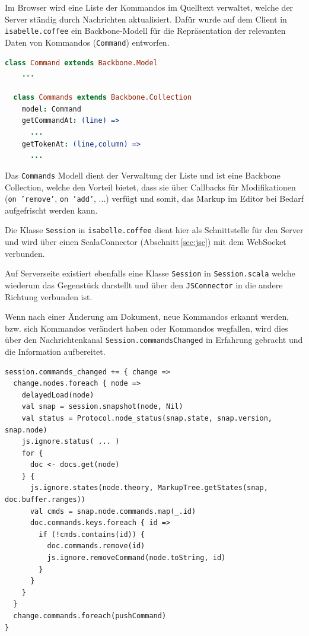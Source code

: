 Im Browser wird eine Liste der Kommandos im Quelltext verwaltet, welche der Server ständig durch
Nachrichten aktualisiert. Dafür wurde auf dem Client in \texttt{isabelle.coffee} ein Backbone-Modell
für die Repräsentation der relevanten Daten von Kommandos (\texttt{Command}) entworfen.

\begin{lstlisting}[language=coffee]
  class Command extends Backbone.Model
    ...

  class Commands extends Backbone.Collection
    model: Command    
    getCommandAt: (line) => 
      ...
    getTokenAt: (line,column) =>
      ...
\end{lstlisting}

Das \texttt{Commands} Modell dient der Verwaltung der Liste und ist eine Backbone Collection, welche
den Vorteil bietet, dass sie über Callbacks für Modifikationen (\texttt{on 'remove'}, \texttt{on
'add'}, ...) verfügt und somit, das Markup im Editor bei Bedarf aufgefrischt werden kann.

Die Klasse \texttt{Session} in \texttt{isabelle.coffee} dient hier als Schnittstelle für den Server
und wird über einen ScalaConnector (Abschnitt\,\ref{sec:jsc}) mit dem WebSocket verbunden.

Auf Serverseite existiert ebenfalls eine Klasse \texttt{Session} in \texttt{Session.scala} welche
wiederum das Gegenstück darstellt und über den \texttt{JSConnector} in die andere Richtung verbunden
ist. 

Wenn nach einer Änderung am Dokument, neue Kommandos erkannt werden, bzw. sich Kommandos verändert
haben oder Kommandos wegfallen, wird dies über den Nachrichtenkanal \texttt{Session.commandsChanged}
in Erfahrung gebracht und die Information aufbereitet.

\begin{lstlisting}
session.commands_changed += { change =>
  change.nodes.foreach { node =>
    delayedLoad(node)
    val snap = session.snapshot(node, Nil)
    val status = Protocol.node_status(snap.state, snap.version, snap.node)      
    js.ignore.status( ... )      
    for {
      doc <- docs.get(node)        
    } {        
      js.ignore.states(node.theory, MarkupTree.getStates(snap, doc.buffer.ranges))
      val cmds = snap.node.commands.map(_.id)
      doc.commands.keys.foreach { id =>
        if (!cmds.contains(id)) {
          doc.commands.remove(id)
          js.ignore.removeCommand(node.toString, id)
        }
      }
    }       
  }
  change.commands.foreach(pushCommand)    
}
\end{lstlisting}

